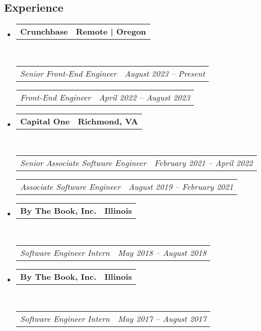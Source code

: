 \documentclass[10pt,letterpaper]{article}
\makeatletter
\newcommand{\headerrow}[2]
{\begin{tabular*}{\linewidth}{l@{\extracolsep{\fill}}r}
  #1 &
  #2 \\
\end{tabular*}}
\makeatother
\begin{document}
\subsection*{Experience}
\begin{itemize}
  \parskip=0.1em

  \item
  \headerrow
    {\textbf{Crunchbase}}
    {\textbf{Remote | Oregon}}
  \\
  \headerrow
    {\emph{Senior Front-End Engineer}}
    {\emph{August 2023 -- Present}}
    \headerrow
    {\emph{Front-End Engineer}}
    {\emph{April 2022 -- August 2023}}

  \item
  \headerrow
    {\textbf{Capital One}}
    {\textbf{Richmond, VA}}
  \\
  \headerrow
    {\emph{Senior Associate Software Engineer}}
    {\emph{February 2021 – April 2022}}
  \headerrow
    {\emph{Associate Software Engineer}}
    {\emph{August 2019 – February 2021}}

  \item
  \headerrow
    {\textbf{By The Book, Inc.}}
    {\textbf{Illinois}}
  \\
  \headerrow
    {\emph{Software Engineer Intern}}
    {\emph{May 2018 -- August 2018}}

  \item
  \headerrow
    {\textbf{By The Book, Inc.}}
    {\textbf{Illinois}}
  \\
  \headerrow
    {\emph{Software Engineer Intern}}
    {\emph{May 2017 -- August 2017}}
\end{itemize}
\end{document}
